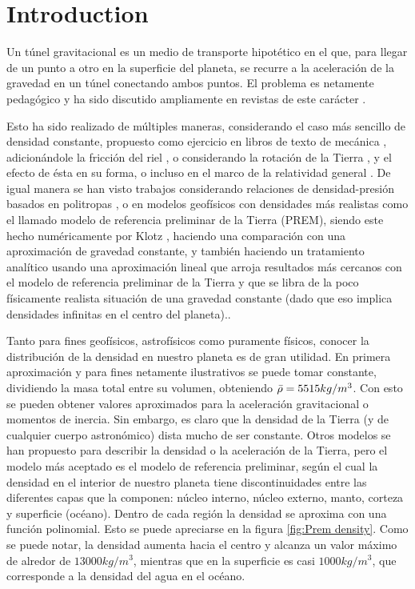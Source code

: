\documentclass[aps,twocolumn,showpacs,preprintnumbers]{revtex4}
\begin{document}
\section{Introduction}

    Un túnel gravitacional es un medio de transporte hipotético en el que, para llegar de un punto a otro en la superficie del planeta, se recurre a la aceleración de la gravedad en un túnel conectando ambos puntos. El problema es netamente pedagógico y ha sido discutido ampliamente en revistas de este carácter
    \citep{History-Tunels}. 
    
     Esto ha sido realizado de múltiples maneras, considerando el caso más sencillo de densidad constante\citep{Venezian}, propuesto como ejercicio en libros de texto de mecánica \cite{Goldstein}, adicionándole la fricción del riel \citep{Tunel-friccioon}, o considerando la rotación de la Tierra \citep{Solomon2, Iserman2, Simonic}, y el efecto de ésta en su forma\citep{Taillet2018},  o incluso en el marco de la relatividad general \citep{Parker2017, Seel}.   De igual manera se han visto trabajos considerando relaciones de densidad-presión basados en politropas \citep{Tunel-Potencia, Politropes2}, o en modelos geofísicos con densidades más realistas como el llamado modelo de referencia preliminar de la Tierra (PREM), siendo este hecho numéricamente por Klotz \citep{gravity-train-prem}, haciendo una comparación  con una aproximación de gravedad constante, y también haciendo un tratamiento analítico usando una aproximación lineal que arroja resultados más cercanos con el modelo de referencia preliminar de la Tierra y que se libra de la poco físicamente realista situación de una gravedad constante (dado que eso implica densidades infinitas en el centro del planeta).\citep{gravity-train-prem-approx, Iserman2}. 

    Tanto para fines geofísicos, astrofísicos como puramente físicos, conocer la distribución de la densidad en nuestro planeta es de gran utilidad. En primera aproximación y para fines netamente ilustrativos se puede tomar constante, dividiendo la masa total entre su volumen, obteniendo $\Bar{\rho}=5515kg/m^3$\citep{AstronomicalConstants}.  Con esto se pueden obtener valores aproximados para la aceleración gravitacional o momentos de inercia. Sin embargo, es claro que la densidad de la Tierra (y de cualquier cuerpo astronómico) dista mucho de ser constante. Otros modelos se han propuesto para describir la densidad \citep{Snyder1985} o la aceleración \citep{Dragoni2020} de 
    la Tierra, pero el modelo más aceptado es el modelo de referencia preliminar, según el cual la densidad en el interior de nuestro planeta tiene discontinuidades entre las diferentes capas que la componen: núcleo interno, núcleo externo, manto, corteza y superficie (océano). Dentro de cada región la densidad se aproxima con una función polinomial.\citep{PREM} Esto se puede apreciarse en la figura \ref{fig:Prem density}. Como se puede notar, la densidad aumenta hacia el centro y alcanza un valor máximo de alredor de $13000kg/m^3$, mientras que en la superficie es casi $1000kg/m^3$, que corresponde a la densidad del agua en el océano. 
    
\end{document}

